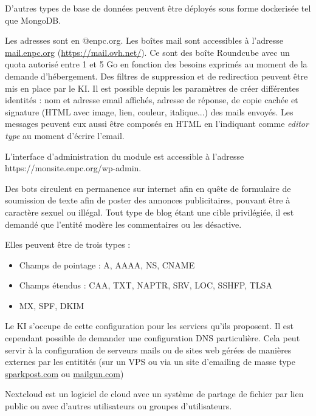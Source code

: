 \documentclass{ki019}
\begin{document}

D'autres types de base de données peuvent être déployés sous forme dockerisée tel que MongoDB.


Les adresses sont en @enpc.org.
Les boîtes mail sont accessibles à l'adresse \url{mail.enpc.org} (\url{https://mail.ovh.net/}).
Ce sont des boîte Roundcube avec un quota autorisé entre 1 et 5 Go en fonction des besoins exprimés au moment de la demande d'hébergement.
Des filtres de suppression et de redirection peuvent être mis en place par le KI.
Il est possible depuis les paramètres de créer différentes identités : nom et adresse email affichés, adresse de réponse, de copie cachée et signature (HTML avec image, lien, couleur, italique...) des mails envoyés.
Les messages peuvent eux aussi être composés en HTML en l'indiquant comme \textit{editor type} au moment d'écrire l'email.


L'interface d'administration du module est accessible à l'adresse https://monsite.enpc.org/wp-admin.

Des bots circulent en permanence sur internet afin en quête de formulaire de soumission de texte afin de poster des annonces publicitaires, pouvant être à caractère sexuel ou illégal. Tout type de blog étant une cible privilégiée, il est demandé que l'entité modère les commentaires ou les désactive.


Elles peuvent être de trois types :
\begin{itemize}
\item Champs de pointage : A, AAAA, NS, CNAME
\item Champs étendus : CAA, TXT, NAPTR, SRV, LOC, SSHFP, TLSA
\item MX, SPF, DKIM
\end{itemize}

Le KI s'occupe de cette configuration pour les services qu'ils proposent. Il est cependant possible de demander une configuration DNS particulière.
Cela peut servir à la configuration de serveurs mails ou de sites web gérées de manières externes par les entitités (sur un VPS ou via un site d'emailing de masse type \url{sparkpost.com} ou \url{mailgun.com})


Nextcloud est un logiciel de cloud avec un système de partage de fichier par lien public ou avec d'autres utilisateurs ou groupes d'utilisateurs.
\end{document}
